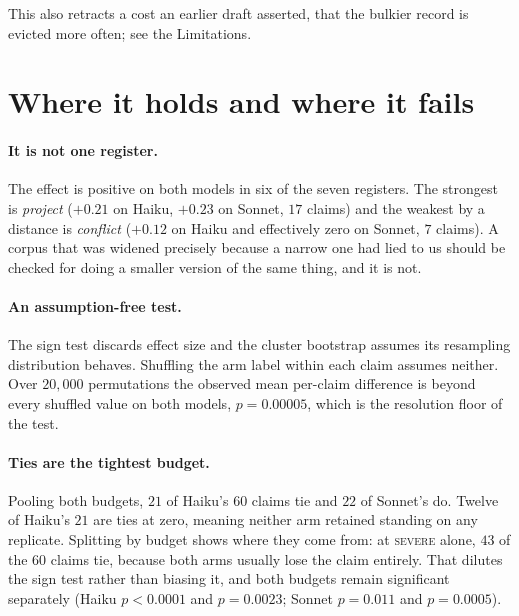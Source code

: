 \documentclass[11pt]{article}
\begin{document}
This also retracts a cost an earlier draft asserted, that the bulkier record is evicted
more often; see the Limitations.

\section{Where it holds and where it fails}
\label{sec:errors}

\paragraph{It is not one register.} The effect is positive on both models in six of the
seven registers. The strongest is \emph{project} ($+0.21$ on Haiku, $+0.23$ on Sonnet,
$17$ claims) and the weakest by a distance is \emph{conflict} ($+0.12$ on Haiku and effectively zero on
Sonnet,
$7$ claims). A corpus that was widened precisely because a narrow one had lied to us
should be checked for doing a smaller version of the same thing, and it is not.

\paragraph{An assumption-free test.} The sign test discards effect size and the cluster
bootstrap assumes its resampling distribution behaves. Shuffling the arm label within each
claim assumes neither. Over $20{,}000$ permutations the observed mean per-claim difference
is beyond every shuffled value on both models, $p=0.00005$, which is the resolution floor
of the test.

\paragraph{Ties are the tightest budget.} Pooling both budgets, $21$ of Haiku's $60$
claims tie and $22$ of Sonnet's do. Twelve of Haiku's $21$ are ties at zero, meaning
neither arm retained standing on any replicate. Splitting by budget shows where they come
from: at \textsc{severe} alone, $43$ of the $60$ claims tie, because both arms usually
lose the claim entirely. That dilutes the sign test rather than biasing it, and both
budgets remain significant separately (Haiku $p<0.0001$ and $p=0.0023$; Sonnet $p=0.011$
and $p=0.0005$).
\end{document}
